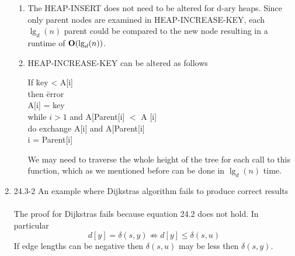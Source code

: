 \documentclass[11pt,fleqn]{article}
\begin{document}
\begin{enumerate}
\begin{enumerate}
\item
The HEAP-INSERT does not need to be altered for d-ary heaps. Since only parent nodes are examined in HEAP-INCREASE-KEY, each $\lg_{d}(n)$ parent could be compared to the new node resulting in a runtime of  $\mbox{{\bfseries O}}(\lg_{d}(n))$. 

\item
HEAP-INCREASE-KEY can be altered as follows \\
\begin{tabbing}
	If \= key < A[i]  \\
	\> then \= error \\
	A[i] = key \\
	while $i>1$ and A[Parent[i] $<$ A [i]\\
	\> do exchange A[i] and A[Parent[i]\\
	\> \>i = Parent[i]\\
\end{tabbing}
We may need to traverse the whole height of the tree for each call to this function, which as we mentioned before can be done in $\lg_{d}(n)$ time. 


\end{enumerate}

\item 
24.3-2 An example where Dijkstras algorithm fails to produce correct results \\
 \\
The proof for Dijkstras fails because equation 24.2 does not hold. In particular
\[
d[y] = \delta(s,y) 
\nRightarrow d[y] 
\leq \delta(s,u) 
\]
If edge lengths can be negative then $\delta(s,u)$ may be less then $\delta(s,y)$.


\end{enumerate}
\end{document}
